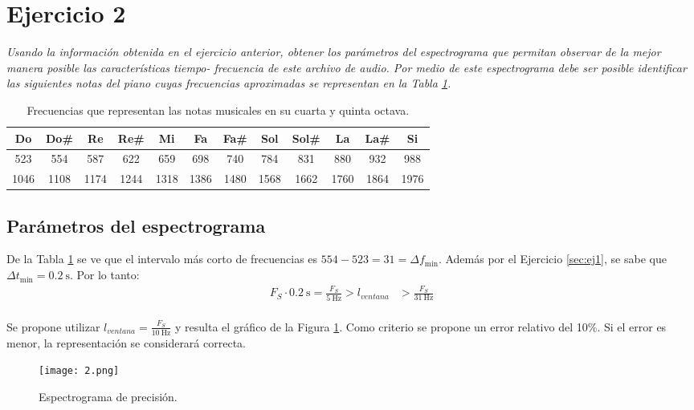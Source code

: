 

\section{Ejercicio 2}
	\begin{flushleft}
		\textit{Usando la información obtenida en el ejercicio anterior, obtener los parámetros del
espectrograma que permitan observar de la mejor manera posible las características tiempo-
frecuencia de este archivo de audio. Por medio de este espectrograma debe ser posible
identificar las siguientes notas del piano cuyas frecuencias aproximadas se representan en la Tabla \ref{tab:notas}.}
	\end{flushleft}

	\begin{table}[H]
		\centering
		\begin{tabular}{*{12}{c}}
			\toprule
			Do&Do\# &Re&Re\# &Mi&Fa&Fa\# &Sol&Sol\# &La&La\# &Si\\
			\midrule
			523&554&587&622&659&698&740&784&831&880&932&988\\
			1046&1108&1174&1244&1318&1386&1480&1568&1662&1760&1864&1976\\
			\bottomrule
		\end{tabular}
		\caption{Frecuencias que representan las notas musicales en su cuarta y quinta octava.}
		\label{tab:notas}
	\end{table}

	\subsection{Parámetros del espectrograma}
		De la Tabla \ref{tab:notas} se ve que el intervalo más corto de frecuencias es $554-523=31=\Delta f_{\min}$. Además por el Ejercicio \ref{sec:ej1}, se sabe que $\Delta t_{\min}=\SI{0.2}{\s}$. Por lo tanto:
		\begin{align*}
			F_S \cdot \SI{0.2}{\s} = \frac{F_S}{\SI{5}{\Hz}} > l_{ventana} &> \frac{F_S}{\SI{31}{\Hz}}\\
		\end{align*}

		Se propone utilizar $l_{ventana}=\frac{F_S}{\SI{10}{\Hz}}$ y resulta el gráfico de la Figura \ref{graf:spec_ej2}.
		Como criterio se propone un error relativo del 10\%. Si el error es menor, la representación se considerará correcta.

		\begin{figure}[h!]
			\centering
			\texttt{[image: 2.png]}
			\caption{Espectrograma de precisión.}
			\label{graf:spec_ej2}
		\end{figure}

